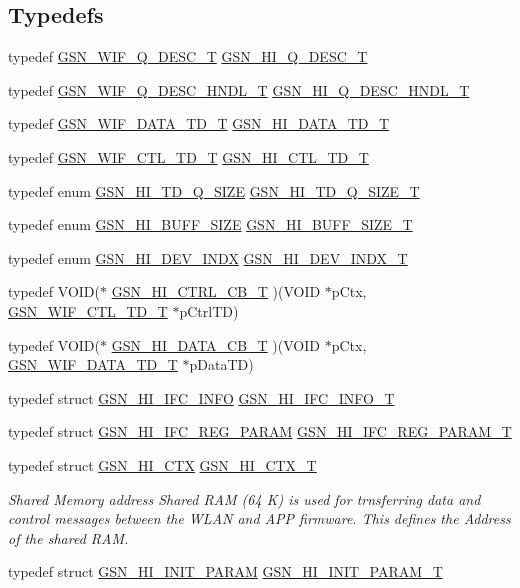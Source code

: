 \subsection*{Typedefs}
\begin{DoxyCompactItemize}
\item 
typedef \hyperlink{a00191}{GSN\_\-WIF\_\-Q\_\-DESC\_\-T} \hyperlink{a00504_a3905dedc9ed3f124095eadfed4f5abe5}{GSN\_\-HI\_\-Q\_\-DESC\_\-T}
\item 
typedef \hyperlink{a00191}{GSN\_\-WIF\_\-Q\_\-DESC\_\-HNDL\_\-T} \hyperlink{a00504_a73258a3b56bb06d739abb2feb99414a0}{GSN\_\-HI\_\-Q\_\-DESC\_\-HNDL\_\-T}
\item 
typedef \hyperlink{a00325}{GSN\_\-WIF\_\-DATA\_\-TD\_\-T} \hyperlink{a00504_a31706a5b40c3056a0b743a89f6c05133}{GSN\_\-HI\_\-DATA\_\-TD\_\-T}
\item 
typedef \hyperlink{a00322}{GSN\_\-WIF\_\-CTL\_\-TD\_\-T} \hyperlink{a00504_a5e4c16c7fbbdd09aba0c540321f7096c}{GSN\_\-HI\_\-CTL\_\-TD\_\-T}
\item 
typedef enum \hyperlink{a00504_a3b998e699fabd8ac8a6463c5645113a0}{GSN\_\-HI\_\-TD\_\-Q\_\-SIZE} \hyperlink{a00504_acb6d991a21f18903617a0d1f76669715}{GSN\_\-HI\_\-TD\_\-Q\_\-SIZE\_\-T}
\item 
typedef enum \hyperlink{a00504_a08d83a81fbc89f1d44c527a3f5ee68e9}{GSN\_\-HI\_\-BUFF\_\-SIZE} \hyperlink{a00504_a12fd1388defb0650e3a3e453d080a348}{GSN\_\-HI\_\-BUFF\_\-SIZE\_\-T}
\item 
typedef enum \hyperlink{a00504_a8a2a6fba490f79e27c9537b300d8f830}{GSN\_\-HI\_\-DEV\_\-INDX} \hyperlink{a00504_a8d08b031d5e7fe5884fe1e266ee7cc52}{GSN\_\-HI\_\-DEV\_\-INDX\_\-T}
\item 
typedef VOID($\ast$ \hyperlink{a00504_a9943ae3de497f108841d00f0b80ff390}{GSN\_\-HI\_\-CTRL\_\-CB\_\-T} )(VOID $\ast$pCtx, \hyperlink{a00322}{GSN\_\-WIF\_\-CTL\_\-TD\_\-T} $\ast$pCtrlTD)
\item 
typedef VOID($\ast$ \hyperlink{a00504_a01ca163707bf2c00971f4e2a9b96fb46}{GSN\_\-HI\_\-DATA\_\-CB\_\-T} )(VOID $\ast$pCtx, \hyperlink{a00325}{GSN\_\-WIF\_\-DATA\_\-TD\_\-T} $\ast$pDataTD)
\item 
typedef struct \hyperlink{a00086}{GSN\_\-HI\_\-IFC\_\-INFO} \hyperlink{a00504_a15e46ea325aab2acdb718f26b2a03009}{GSN\_\-HI\_\-IFC\_\-INFO\_\-T}
\item 
typedef struct \hyperlink{a00087}{GSN\_\-HI\_\-IFC\_\-REG\_\-PARAM} \hyperlink{a00504_acdefdd55143ac5ad28ad1a8dcb797d24}{GSN\_\-HI\_\-IFC\_\-REG\_\-PARAM\_\-T}
\item 
typedef struct \hyperlink{a00085}{GSN\_\-HI\_\-CTX} \hyperlink{a00623_gab04b88d48bd4d71618f6790808c3484c}{GSN\_\-HI\_\-CTX\_\-T}
\begin{DoxyCompactList}\small\item\em Shared Memory address Shared RAM (64 K) is used for trnsferring data and control messages between the WLAN and APP firmware. This defines the Address of the shared RAM. \end{DoxyCompactList}\item 
typedef struct \hyperlink{a00088}{GSN\_\-HI\_\-INIT\_\-PARAM} \hyperlink{a00504_add93d994a6bf408b8e0743f1d249a7ca}{GSN\_\-HI\_\-INIT\_\-PARAM\_\-T}
\end{DoxyCompactItemize}
